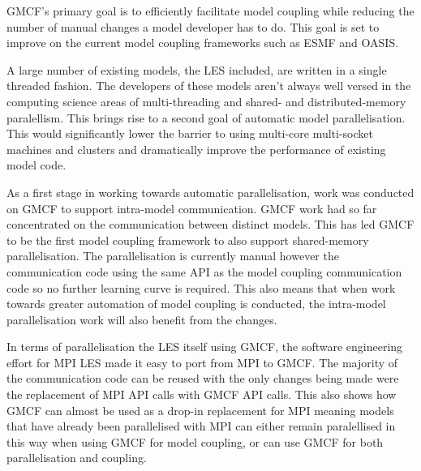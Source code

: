 GMCF's primary goal is to efficiently facilitate model coupling while reducing
the number of manual changes a model developer has to do. This goal is set to
improve on the current model coupling frameworks such as ESMF and OASIS.

A large number of existing models, the LES included, are written in a single
threaded fashion. The developers of these models aren't always well versed in
the computing science areas of multi-threading and shared- and
distributed-memory paralellism. This brings rise to a second goal of automatic
model parallelisation. This would significantly lower the barrier to using
multi-core multi-socket machines and clusters and dramatically improve the
performance of existing model code.

As a first stage in working towards automatic parallelisation, work was
conducted on GMCF to support intra-model communication. GMCF work had so far
concentrated on the communication between distinct models. This has led GMCF to
be the first model coupling framework to also support shared-memory
parallelisation. The parallelisation is currently manual however the
communication code using the same API as the model coupling communication code
so no further learning curve is required. This also means that when work towards
greater automation of model coupling is conducted, the intra-model
parallelisation work will also benefit from the changes.

In terms of parallelisation the LES itself using GMCF, the software engineering
effort for MPI LES made it easy to port from MPI to GMCF. The majority of the
communication code can be reused with the only changes being made were the
replacement of MPI API calls with GMCF API calls. This also shows how GMCF can
almost be used as a drop-in replacement for MPI meaning models that have already
been parallelised with MPI can either remain paralellised in this way when using
GMCF for model coupling, or can use GMCF for both parallelisation and coupling.
